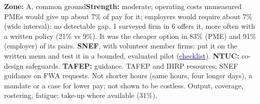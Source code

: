   {\textbf{Zone:} A, common ground\quad\textbf{Strength:} moderate; operating costs unmeasured}
  {
   PMEs would give up about 7\% of pay for it; employers would require about 7\% (wide interval): no detectable gap. 1 surveyed firm in 6 offers it, more often with a written policy (21\% vs 9\%). It was the cheaper option in 83\% (PME) and 91\% (employer) of its pairs.}
  {%
   \textbf{SNEF}, with volunteer member firms: put it on the written menu and test it in a bounded, evaluated pilot (\hyperlink{B-pilot}{\textcolor{Navy}{checklist}}). \textbf{NTUC:} co-design safeguards. \textbf{TAFEP:} guidance.}
  {%
   TAFEP and IHRP resources; SNEF guidance on FWA requests.}
  {%
   Not shorter hours (same hours, four longer days), a mandate or a case for lower pay; not shown to be costless.}
  {%
   Output, coverage, rostering, fatigue; take-up where available (31\%).}
  {%
   }

